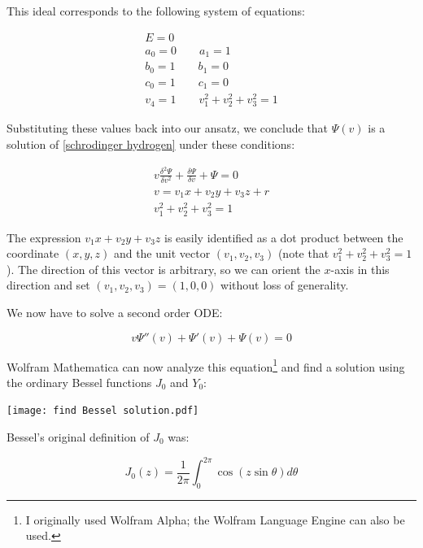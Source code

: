 \documentclass{article}
\begin{document}
This ideal corresponds to the following system of equations:

\begin{equation}
\begin{gathered}
E = 0 \\
a_0 = 0 \qquad
a_1 = 1 \\
b_0 = 1 \qquad
b_1 = 0 \\
c_0 = 1 \qquad
c_1 = 0 \\
v_4 = 1 \qquad
v_1^2 + v_2^2 + v_3^2 = 1
\end{gathered}
\end{equation}

Substituting these values back into our ansatz, we conclude that $\Psi(v)$
is a solution of \eqref{schrodinger hydrogen} under these conditions:

\begin{equation}
\label{related solution}
\begin{gathered}
v \frac{\delta^2\Psi}{\delta v^2} + \frac{\delta\Psi}{\delta v} + \Psi = 0 \\
v = v_1 x+ v_2 y+ v_3 z+r \\
v_1^2 + v_2^2 + v_3^2 = 1
\end{gathered}
\end{equation}

The expression $v_1 x + v_2 y + v_3 z$ is easily identified as a dot product between
the coordinate $(x,y,z)$ and the unit vector $(v_1, v_2, v_3)$ (note
that $v_1^2 + v_2^2 + v_3^2 = 1$).  The direction of this vector is arbitrary,
so we can orient the $x$-axis in this direction and set $(v_1, v_2, v_3) = (1,0,0)$
without loss of generality.

We now have to solve a second order ODE:

\begin{equation}
v \Psi''(v) + \Psi'(v) + \Psi(v) = 0
\end{equation}

Wolfram Mathematica\cite{Mathematica} can now
analyze this equation\footnote{I originally used Wolfram Alpha; the Wolfram Language Engine can also be used.}
and find a solution using the ordinary Bessel functions $J_0$ and $Y_0$:

\texttt{[image: find Bessel solution.pdf]}

Bessel's original definition of $J_0$ \cite[p. 19]{Watson} was:

\begin{equation}
\label{J0 definition}
J_0(z) = \frac{1}{2\pi}\int_0^{2\pi} \cos(z\sin\theta) d\theta
\end{equation}
\end{document}
